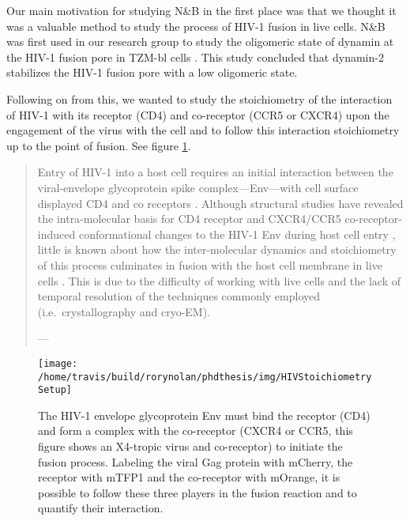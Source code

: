 \documentclass[12pt,]{book}
\theoremstyle{definition}
\theoremstyle{definition}
\theoremstyle{definition}
\theoremstyle{remark}
\begin{document}
Our main motivation for studying N\&B in the first place was that we
thought it was a valuable method to study the process of HIV-1 fusion in
live cells. N\&B was first used in our research group to study the
oligomeric state of dynamin at the HIV-1 fusion pore in TZM-bl cells
\citep{DanDynamin}. This study concluded that dynamin-2 stabilizes the
HIV-1 fusion pore with a low oligomeric state.

Following on from this, we wanted to study the stoichiometry of the
interaction of HIV-1 with its receptor (CD4) and co-receptor (CCR5 or
CXCR4) upon the engagement of the virus with the cell and to follow this
interaction stoichiometry up to the point of fusion. See figure
\ref{fig:HIVStoichiometrySetup}.

\begin{quote}
Entry of HIV-1 into a host cell requires an initial interaction between
the viral-envelope glycoprotein spike complex---Env---with cell surface
displayed CD4 and co receptors \citep{Jakobsdottir}. Although structural
studies have revealed the intra-molecular basis for CD4 receptor and
CXCR4/CCR5 co-receptor-induced conformational changes to the HIV-1 Env
during host cell entry \citep{Ozorowski}, little is known about how the
inter-molecular dynamics and stoichiometry of this process culminates in
fusion with the host cell membrane in live cells \citep{Brandenberg}.
This is due to the difficulty of working with live cells and the lack of
temporal resolution of the techniques commonly employed
(i.e.~crystallography and cryo-EM).

--- \citet{HIVstoichiometry}
\end{quote}









\begin{figure}

\texttt{[image: /home/travis/build/rorynolan/phdthesis/img/HIVStoichiometrySetup]} \hfill{}

\caption{The HIV-1 envelope glycoprotein Env
must bind the receptor (CD4) and form a complex with the co-receptor
(CXCR4 or CCR5, this figure shows an X4-tropic virus and co-receptor) to
initiate the fusion process. Labeling the viral Gag protein with
mCherry, the receptor with mTFP1 and the co-receptor with mOrange, it is
possible to follow these three players in the fusion reaction and to
quantify their interaction.}\label{fig:HIVStoichiometrySetup}
\end{figure}
\end{document}
